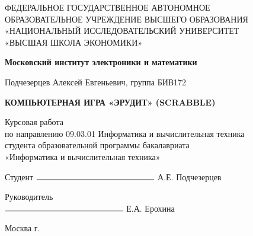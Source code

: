 \begin{titlepage}
	\begin{center}
		ФЕДЕРАЛЬНОЕ  ГОСУДАРСТВЕННОЕ АВТОНОМНОЕ \\
		ОБРАЗОВАТЕЛЬНОЕ УЧРЕЖДЕНИЕ ВЫСШЕГО ОБРАЗОВАНИЯ\\
		«НАЦИОНАЛЬНЫЙ ИССЛЕДОВАТЕЛЬСКИЙ УНИВЕРСИТЕТ\\
		«ВЫСШАЯ ШКОЛА ЭКОНОМИКИ»
	\end{center}
	
	\begin{center}
		\textbf{Московский институт электроники и математики}
	\end{center}
	\vspace{1ex}	
	\begin{center}
		Подчезерцев Алексей Евгеньевич, группа БИВ172
	\end{center}	
	\vspace{1ex}
	\begin{center}
		\textbf{КОМПЬЮТЕРНАЯ ИГРА «ЭРУДИТ» (SCRABBLE)}
	\end{center}	
	\vspace{2ex}
	\begin{center}
		Курсовая работа\\
		по направлению 09.03.01 Информатика и вычислительная техника\\
		студента образовательной программы бакалавриата\\
		«Информатика и вычислительная техника»
	\end{center}
	\vspace{2ex}
	\begin{flushright}
		Студент $\rule{5cm}{0.15mm}$ А.Е. Подчезерцев 
	\end{flushright}
	\vspace{3ex}
	\begin{flushright}
		Руководитель\\
		$\rule{5cm}{0.15mm}$ Е.А. Ерохина
	\end{flushright}
	\vfill
	\begin{center}
		Москва \the\year г.
	\end{center}
\end{titlepage}